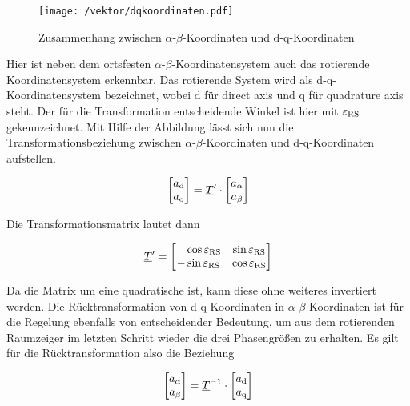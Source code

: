 \begin{figure}[h]
	\centering
	\texttt{[image: /vektor/dqkoordinaten.pdf]}
	\label{fig:dqkoordinaten}
	\caption{Zusammenhang zwischen $\alpha$-$\beta$-Koordinaten und d-q-Koordinaten}
\end{figure}


Hier ist neben dem ortsfesten $\alpha$-$\beta$-Koordinatensystem auch das rotierende Koordinatensystem erkennbar. 
Das rotierende System wird als d-q-Koordinatensystem bezeichnet, wobei d für direct axis und q für quadrature axis steht.
Der für die Transformation entscheidende Winkel ist hier mit $\varepsilon_{\mathrm{RS}}$ gekennzeichnet.
Mit Hilfe der Abbildung lässt sich nun die Transformationsbeziehung zwischen $\alpha$-$\beta$-Koordinaten und d-q-Koordinaten aufstellen.

\begin{align}
	\begin{bmatrix}
		a_{\mathrm{d}} \\
		a_{\mathrm{q}} 
	\end{bmatrix}
	=\underline{T}{^\prime}\cdot 
	\begin{bmatrix}
		a_{\alpha} \\
		a_{\beta}
	\end{bmatrix}
	\label{parkvektor}
\end{align}

Die Transformationsmatrix lautet dann

\begin{align}
	\underline{T}{^\prime} =
	\begin{bmatrix}
		~~~\cos{\varepsilon_{\mathrm{RS}}} & \sin{\varepsilon_{\mathrm{RS}}} \\
		-\sin{\varepsilon_{\mathrm{RS}}} & \cos{\varepsilon_{\mathrm{RS}}}
	\end{bmatrix}
	\label{parkmatrix}
\end{align}

Da die Matrix um eine quadratische ist, kann diese ohne weiteres invertiert werden.
Die Rücktransformation von d-q-Koordinaten in $\alpha$-$\beta$-Koordinaten ist für die Regelung ebenfalls von entscheidender Bedeutung, um aus dem rotierenden Raumzeiger im letzten Schritt wieder die drei Phasengrößen zu erhalten. 
Es gilt für die Rücktransformation also die Beziehung

\begin{align}
	\begin{bmatrix}
		a_{\alpha} \\
		a_{\beta}
	\end{bmatrix}
	=\underline{T}^{-1}\cdot 
	\begin{bmatrix}
		a_{\mathrm{d}} \\
		a_{\mathrm{q}} 
	\end{bmatrix}
	\label{parkvektorinvers}
\end{align}

